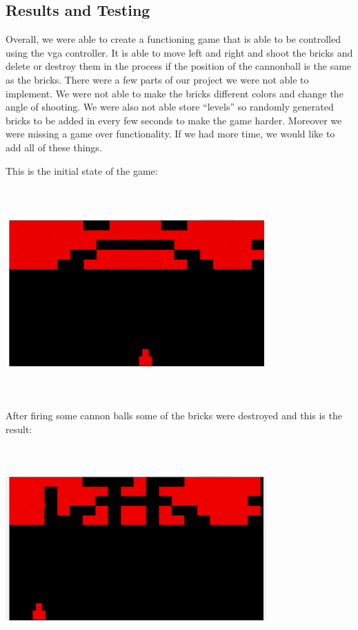 \documentclass[12pt]{article}
\begin{document}
\begin{flushleft}
\section{Results and Testing}

Overall, we were able to create a functioning game that is able to be controlled
using the vga controller. It is able to move left and right and shoot the bricks
and delete or destroy them in the process if the position of the cannonball is
the same as the bricks. There were a few parts of our project we were not able
to implement. We were not able to make the bricks different colors and change
the angle of shooting. We were also not able store “levels” so randomly
generated bricks to be added in every few seconds to make the game harder.
Moreover we were missing a game over functionality. If we had more time, we
would like to add all of these things. 

This is the initial state of the game: \\
\begin{center}
\includegraphics[width=10cm, height=8cm]{game1}
\end{center}

After firing some cannon balls some of the bricks were destroyed and this is
the result:\\
\begin{center}
\includegraphics[width=10cm, height=8cm]{game2}
\end{center}


\end{flushleft}
\end{document}
